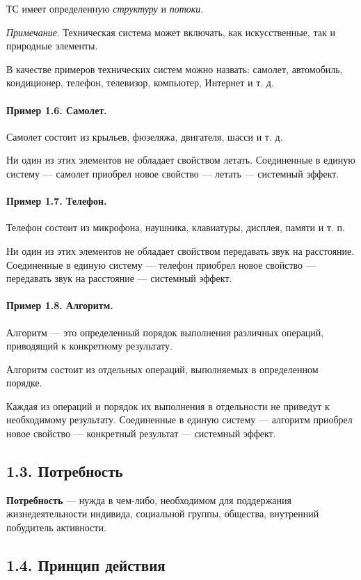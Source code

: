 \documentclass[11pt,a4paper]{article}
\begin{document}
ТС имеет определенную \emph{структуру} и \emph{потоки}.

\emph{Примечание}. Техническая система может включать, как искусственные, так и
природные элементы.

В качестве примеров технических систем можно назвать: самолет, автомобиль,
кондиционер, телефон, телевизор, компьютер, Интернет и т. д.

\paragraph{Пример 1.6. Самолет.}
Самолет состоит из крыльев, фюзеляжа, двигателя, шасси и т. д.

Ни один из этих элементов не обладает свойством летать. Соединенные в единую
систему — самолет приобрел новое свойство — летать — системный эффект.

\paragraph{Пример 1.7. Телефон.}
Телефон состоит из микрофона, наушника, клавиатуры, дисплея, памяти и т. п.

Ни один из этих элементов не обладает свойством передавать звук на
расстояние. Соединенные в единую систему — телефон приобрел новое свойство —
передавать звук на расстояние — системный эффект.

\paragraph{Пример 1.8. Алгоритм.}
Алгоритм — это определенный порядок выполнения различных операций, приводящий
к конкретному результату.

Алгоритм состоит из отдельных операций, выполняемых в определенном порядке.

Каждая из операций и порядок их выполнения в отдельности не приведут к
необходимому результату. Соединенные в единую систему — алгоритм приобрел
новое свойство — конкретный результат — системный эффект.

\subsection*{1.3. Потребность}

\textbf{Потребность} — нужда в чем-либо, необходимом для поддержания
жизнедеятельности индивида, социальной группы, общества, внутренний побудитель
активности.

\subsection*{1.4. Принцип действия}
\end{document}
